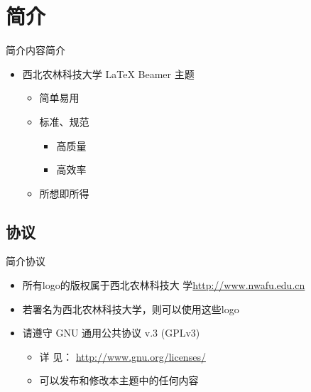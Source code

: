 \section{简介}
\begin{frame}{简介}{内容简介}
  \begin{itemize}
  \item 西北农林科技大学 {\LaTeX} \alert{Beamer 主题}
    \begin{itemize}
    \item 简单易用
    \item 标准、规范
      \begin{itemize}
      \item 高质量
      \item 高效率
      \end{itemize}
    \item \alert{所想即所得}
    \end{itemize}
  \end{itemize}
\end{frame}

\subsection{协议}
\begin{frame}{简介}{协议}
  \begin{itemize}
  \item 所有logo的版权属于西北农林科技大
    学\href{http://www.nwafu.edu.cn}{http://www.nwafu.edu.cn}
  \item 若署名为西北农林科技大学，则可以使用这些logo
  \item 请遵守 GNU 通用公共协议 v.3 (GPLv3)
    \begin{itemize}
    \item 详
      见：
      \href{http://www.gnu.org/licenses/}{http://www.gnu.org/licenses/}
    \item 可以发布和修改本主题中的任何内容
    \end{itemize}
  \end{itemize}
\end{frame}

